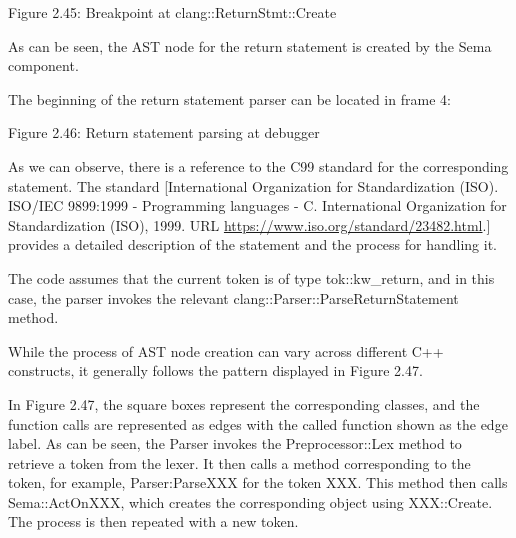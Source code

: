 \begin{center}
Figure 2.45: Breakpoint at clang::ReturnStmt::Create
\end{center}

As can be seen, the AST node for the return statement is created by the Sema component.

The beginning of the return statement parser can be located in frame 4:


\begin{center}
Figure 2.46: Return statement parsing at debugger
\end{center}

As we can observe, there is a reference to the C99 standard for the corresponding statement. The standard [International Organization for Standardization (ISO). ISO/IEC 9899:1999 - Programming languages - C. International Organization for Standardization (ISO), 1999. URL \url{https://www.iso.org/standard/23482.html}.] provides a detailed description of the statement and the process for handling it.

The code assumes that the current token is of type tok::kw\_return, and in this case, the parser invokes the relevant clang::Parser::ParseReturnStatement method.

While the process of AST node creation can vary across different C++ constructs, it generally follows the pattern displayed in Figure 2.47.


In Figure 2.47, the square boxes represent the corresponding classes, and the function calls are represented as edges with the called function shown as the edge label. As can be seen, the Parser invokes the Preprocessor::Lex method to retrieve a token from the lexer. It then calls a method corresponding to the token, for example, Parser:ParseXXX for the token XXX. This method then calls Sema::ActOnXXX, which creates the corresponding object using XXX::Create. The process is then repeated with a new token.

